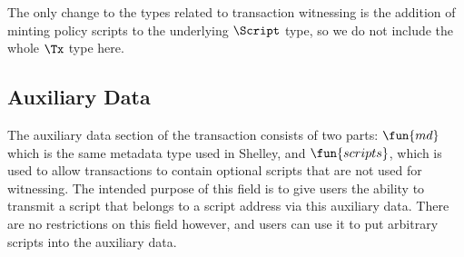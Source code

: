 The only change to the types related to transaction witnessing is the addition
of minting policy scripts to the underlying $\Script$ type, so we do not include the
whole $\Tx$ type here.

\subsection*{Auxiliary Data}

The auxiliary data section of the transaction consists of two parts:
$\fun{md}$ which is the same metadata type used in
Shelley, and $\fun{scripts}$, which is used to allow transactions to
contain optional scripts that are not used for witnessing. The
intended purpose of this field is to give users the ability to
transmit a script that belongs to a script address via this
auxiliary data. There are no restrictions on this field however, and users
can use it to put arbitrary scripts into the auxiliary data.
